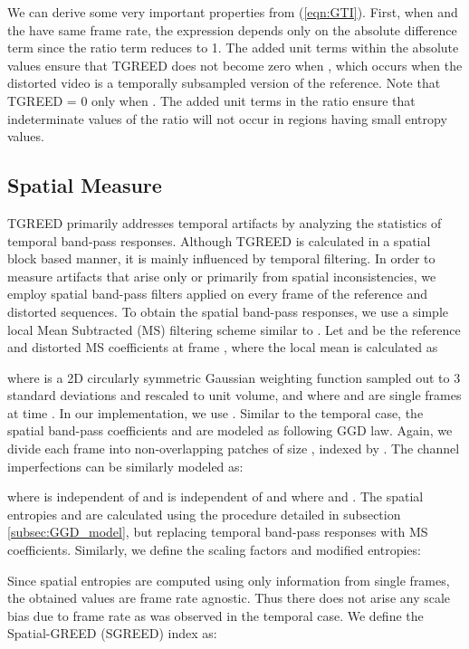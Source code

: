 \documentclass[journal]{IEEEtran}
\begin{document}
We can derive some very important properties from (\ref{eqn:GTI}). First, when  and  the have same frame rate, the expression depends only on the absolute difference term since the ratio term reduces to 1. The added unit terms within the absolute values ensure that TGREED does not become zero when , which occurs when the distorted video is a temporally subsampled version of the reference. Note that TGREED = 0 only when . The added unit terms in the ratio ensure that indeterminate values of the ratio will not occur in regions having small entropy values.

\subsection{Spatial Measure}
TGREED primarily addresses temporal artifacts by analyzing the statistics of temporal band-pass responses. Although TGREED is calculated in a spatial block based manner, it is mainly influenced by temporal filtering. In order to measure artifacts that arise only or primarily from spatial inconsistencies, we employ spatial band-pass filters applied on every frame of the reference and distorted sequences. To obtain the spatial band-pass responses, we use a simple local Mean Subtracted (MS) filtering scheme similar to \cite{bampis2017speed}. Let  and  be the reference and distorted MS coefficients at frame , where the local mean is calculated as

where  is a 2D circularly symmetric Gaussian weighting function sampled out to 3 standard deviations and rescaled to unit volume, and where  and  are single frames at time . In our implementation, we use . Similar to the temporal case, the spatial band-pass coefficients  and  are modeled as following GGD law. Again, we divide each frame into non-overlapping patches of size , indexed by . The channel imperfections can be similarly modeled as:

where  is independent of  and  is independent of  and where  and . The spatial entropies  and  are calculated using the procedure detailed in subsection \ref{subsec:GGD_model}, but replacing temporal band-pass responses with MS coefficients. Similarly, we define the scaling factors and modified entropies:

Since spatial entropies are computed using only information from single frames, the obtained values are frame rate agnostic. Thus there does not arise any scale bias due to frame rate as was observed in the temporal case. We define the Spatial-GREED (SGREED) index as:
\end{document}
